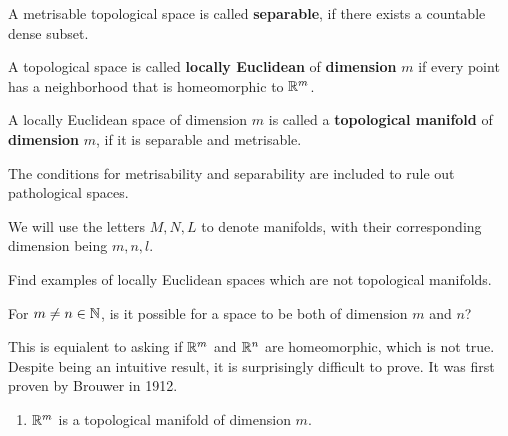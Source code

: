 \begin{dfn}[]
A metrisable topological space is called \textbf{separable}, if there exists a countable dense subset.
\end{dfn}



\begin{dfn}[]
A topological space is called \textbf{locally Euclidean} of \textbf{dimension} $m$ if every point has a neighborhood that is homeomorphic to $\mathbb{R}^{m}$.
\end{dfn}



\begin{dfn}[]
  A locally Euclidean space of dimension $m$ is called a \textbf{topological manifold} of \textbf{dimension} $m$, if it is separable and metrisable.
\end{dfn}
The conditions for metrisability and separability are included to rule out pathological spaces.

We will use the letters $M,N,L$ to denote manifolds, with their corresponding dimension being $m,n,l$.


\begin{ex}[]
Find examples of locally Euclidean spaces which are not topological manifolds.
\end{ex}


\begin{rem}[]
For $m\neq n \in \mathbb{N}$, is it possible for a space to be both of dimension $m$ and $n$?

This is equialent to asking if $\mathbb{R}^{m}$ and $\mathbb{R}^{n}$ are homeomorphic, which is not true.
Despite being an intuitive result, it is surprisingly difficult to prove.
It was first proven by Brouwer in 1912.
\end{rem}




\begin{xmp}[]
  \phantom{a}
  \begin{enumerate}
    \item $\mathbb{R}^{m}$ is a topological manifold of dimension $m$.
  \end{enumerate}

\end{xmp}

